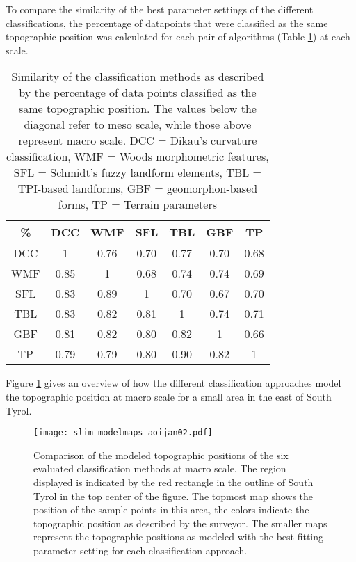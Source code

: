 \documentclass[preprint,12pt,authoryear]{elsarticle}
\begin{document}
To compare the similarity of the best parameter settings of the different classifications, the percentage of datapoints that were classified as the same topographic position was calculated for each pair of algorithms (Table \ref{table:similarity_matrix}) at each scale. 
\begin{table}[ht]
\caption{Similarity of the classification methods as described by the percentage of data points classified as the same topographic position. The values below the diagonal refer to meso scale, while those above represent macro scale. DCC = Dikau's curvature classification, WMF = Woods morphometric features, SFL = Schmidt's fuzzy landform elements, TBL = TPI-based landforms, GBF = geomorphon-based forms, TP = Terrain parameters}
\centering
\begin{tabular}{ccccccc}
  \hline
\%  & DCC & WMF &SFL &TBL & GBF & TP \\ 
  \hline
DCC &1 & 0.76 & 0.70 & 0.77 & 0.70 & 0.68 \\ 
WMF &0.85  & 1 & 0.68 & 0.74 & 0.74 & 0.69 \\ 
SFL & 0.83 & 0.89 & 1 & 0.70 & 0.67 & 0.70 \\ 
TBL & 0.83 &0.82  &0.81  & 1 & 0.74 & 0.71 \\ 
GBF &0.81  &0.82  & 0.80  & 0.82 & 1 & 0.66 \\ 
TP &0.79  &0.79  &0.80  &0.90  &0.82  & 1 \\ 
   \hline
\end{tabular}
\label{table:similarity_matrix}
\end{table}
Figure \ref{fig:resultmaps} gives an overview of how the different classification approaches model the topographic position at macro scale for a small area in the east of South Tyrol.
\begin{figure}
\texttt{[image: slim\_modelmaps\_aoijan02.pdf]}
\caption{Comparison of the modeled topographic positions of the six evaluated classification methods at macro scale. The region displayed is indicated by the red rectangle in the outline of South Tyrol in the top center of the figure. The topmost map shows the position of the sample points in this area, the colors indicate the topographic position as described by the surveyor. The smaller maps represent the topographic positions as modeled with the best fitting parameter setting for each classification approach.}
\label{fig:resultmaps}
\end{figure}
\end{document}
